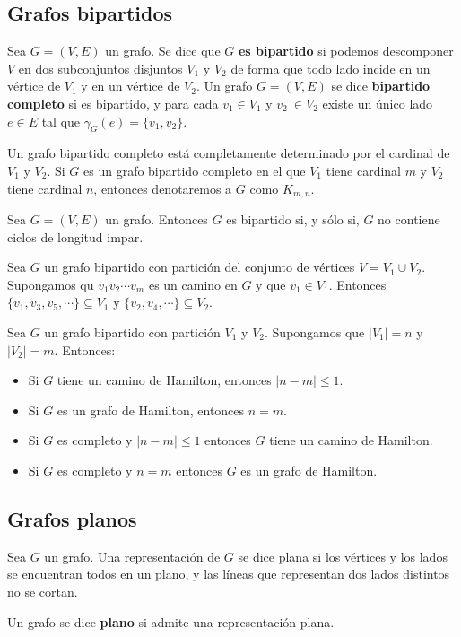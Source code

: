 \subsection{Grafos bipartidos}
\begin{ndef}
    Sea $G= (V, E)$ un grafo. Se dice que $G$ \textbf{es bipartido} si podemos descomponer $V$ en dos subconjuntos disjuntos $V_1$ y $V_2$ de forma que todo lado incide en un vértice de $V_1$ y en un vértice de $V_2$. Un grafo $G= (V, E)$ se dice \textbf{bipartido completo} si es bipartido, y para cada $v_1 \in V_1$ y $v_2\ \in V_2$ existe un único lado $e \in E$ tal que $\gamma_G(e) =\{v_1, v_2\}$.
\end{ndef}
Un grafo bipartido completo está completamente determinado por el cardinal de $V_1$ y $V_2$. Si $G$ es un grafo bipartido completo en el que $V_1$ tiene cardinal $m$ y $V_2$ tiene cardinal $n$, entonces denotaremos a $G$ como $K_{m,n}$.
\begin{nth}
    Sea $G= (V, E)$ un grafo. Entonces $G$ es bipartido si, y sólo si, $G$ no contiene ciclos de longitud impar.
\end{nth}
\begin{lema}
    Sea $G$ un grafo bipartido con partición del conjunto de vértices $V = V_1 \cup V_2$. Supongamos qu $v_1v_2\cdots v_m$ es un camino en $G$ y que $v_1 \in V_1$. Entonces $\{v_1,v_3,v_5,\cdots\} \subseteq V_1$ y $\{v_2,v_4,\cdots\} \subseteq V_2$.
\end{lema}
\begin{nprop}
    Sea $G$ un grafo bipartido con partición $V_1$ y $V_2$. Supongamos que $|V_1|=n$ y $|V_2|=m$. Entonces:
    \begin{itemize}
        \item Si $G$ tiene un camino de Hamilton, entonces $|n-m| \leq 1$.
        \item Si $G$ es un grafo de Hamilton, entonces $n=m$.
        \item Si $G$ es completo y $|n-m|\leq 1$ entonces $G$ tiene un camino de Hamilton.
        \item Si $G$ es completo y $n=m$ entonces $G$ es un grafo de Hamilton.
    \end{itemize}
\end{nprop}

\subsection{Grafos planos}
\begin{ndef}
    Sea $G$ un grafo. Una representación de $G$ se dice plana si los vértices y los lados se encuentran todos en un plano, y las líneas que representan dos lados distintos no se cortan.
\end{ndef}
Un grafo se dice \textbf{plano} si admite una representación plana.

